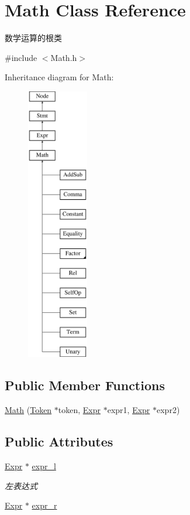 \hypertarget{class_math}{}\section{Math Class Reference}
\label{class_math}


数学运算的根类  




{\ttfamily \#include $<$Math.\+h$>$}

Inheritance diagram for Math\+:\begin{figure}[H]
\begin{center}
\leavevmode
\includegraphics[height=12.000000cm]{class_math}
\end{center}
\end{figure}
\subsection*{Public Member Functions}
\begin{DoxyCompactItemize}
\item 
\hyperlink{class_math_af045a09f80d73b385d902041bc5cf41e}{Math} (\hyperlink{class_token}{Token} $\ast$token, \hyperlink{class_expr}{Expr} $\ast$expr1, \hyperlink{class_expr}{Expr} $\ast$expr2)
\end{DoxyCompactItemize}
\subsection*{Public Attributes}
\begin{DoxyCompactItemize}
\item 
\mbox{\label{class_math_a551d177c9245212a8b5374ea1e4024ea}} 
\hyperlink{class_expr}{Expr} $\ast$ \hyperlink{class_math_a551d177c9245212a8b5374ea1e4024ea}{expr\+\_\+l}
\begin{DoxyCompactList}\small\item\em 左表达式 \end{DoxyCompactList}\item 
\hyperlink{class_expr}{Expr} $\ast$ \hyperlink{class_math_a2e2eb1f4f47fd10466db783b20183307}{expr\+\_\+r}
\end{DoxyCompactItemize}
